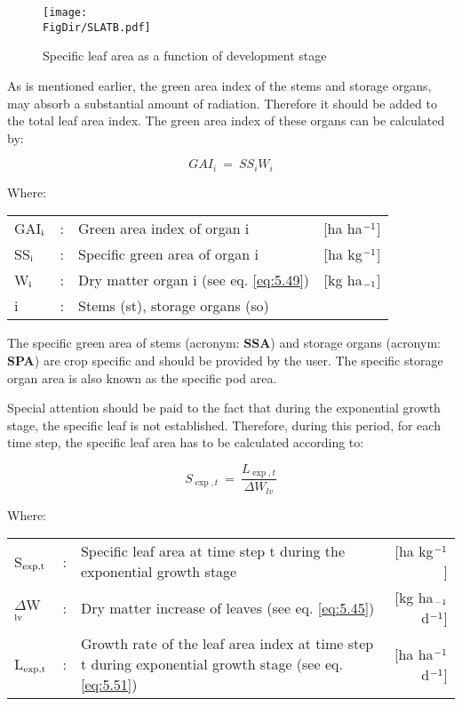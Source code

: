 \begin{figure}[p]
	\centering
	\texttt{[image: \\FigDir/SLATB.pdf]}
	\caption{Specific leaf area as a function of development stage}
	\label{fig:SpecificLeafArea}
\end{figure}

As is mentioned earlier, the green area index of the stems and storage organs, may absorb
a substantial amount of radiation. Therefore it should be added to the total leaf area
index. The green area index of these organs can be calculated by:

\begin{equation}
GAI_{i} ~=~SS _{i} W _{i} 
\end{equation}

Where:\\[5pt]
\begin{tabularx}{\textwidth}{llXr}
	GAI$_{{\rm i}}$ &:& Green area index of organ i    &
	[ha ha$^{{\rm -1}}$]\\
	SS$_{{\rm i}}$ &:& Specific green area of organ i    &
	[ha kg$^{{\rm -1}}$]\\
	W$_{{\rm i}}$ &:& Dry matter organ i (see eq. \ref{eq:5.49})    &
	[kg ha$_{{\rm -1}}$]\\
	i &:& Stems (st), storage organs (so)\\
\end{tabularx}

The specific green area of stems (acronym: {\bf SSA}) and storage organs (acronym: {\bf SPA}) are
crop specific and should be provided by the user. The specific storage organ area is also
known as the specific pod area.

Special attention should be paid to the fact that during the exponential growth stage, the
specific leaf is not established. Therefore, during this period, for each time step, the
specific leaf area has to be calculated according to:

\begin{equation}
S_{\exp,t} ~=~ {\frac{L_{\exp,t}}{\Delta W_{lv} }}
\end{equation}

Where:\\[5pt]
\begin{tabularx}{\textwidth}{llXr}
	S$_{{\rm exp,t}}$ &:& Specific leaf area at time step t during the 
	exponential growth stage    &     [ha kg$^{{\rm -1}}$]\\
	$\Delta$W$_{{\rm lv}}$ &:& Dry matter increase of leaves (see eq. \ref{eq:5.45})   &
	[kg ha$_{{\rm -1}}$ d$^{{\rm -1}}$]\\
	L$_{{\rm \exp,t}}$ &:& Growth rate of the leaf area index at time step t
	during exponential growth stage (see eq. \ref{eq:5.51})   &
	[ha ha$^{{\rm -1}}$ d$^{{\rm -1}}$]\\
\end{tabularx}


